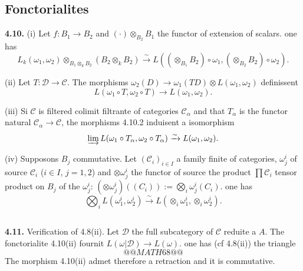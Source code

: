 \documentclass[12pt,a4paper]{article}
\theoremstyle{plain}
\theoremstyle{definition}
\theoremstyle{remark}
\begin{document}
\subsection{Fonctorialites}

\textbf{4.10.} (i) Let $f : B_1 \to B_2$ and $(\cdot) \otimes_{B_2} B_1$ the functor of extension of scalars. one has
\begin{equation}\label{eq:4.10.1}
L_k(\omega_1, \omega_2) \otimes_{B_1 \otimes_k B_2} (B_2 \otimes_k B_2) \xrightarrow{\sim} L((\otimes_{B_1} B_2) \circ \omega_1, (\otimes_{B_2} B_2) \circ \omega_2).
\end{equation}

(ii) Let $T : \mathcal{D} \to \mathcal{C}$. The morphisms $\omega_2(D) \to \omega_1(TD) \otimes L(\omega_1,\omega_2)$ definissent
\begin{equation}\label{eq:4.10.2}
L(\omega_1 \circ T, \omega_2 \circ T) \longrightarrow L(\omega_1,\omega_2).
\end{equation}

(iii) Si $\mathcal{C}$ is filtered colimit filtrante of categories $\mathcal{C}_\alpha$ and that $T_\alpha$ is the functor natural $\mathcal{C}_\alpha \to \mathcal{C}$, the morphisms 4.10.2 induisent a isomorphism
\begin{equation}\label{eq:4.10.3}
\varinjlim L(\omega_1 \circ T_\alpha, \omega_2 \circ T_\alpha) \xrightarrow{\sim} L(\omega_1,\omega_2).
\end{equation}

(iv) Supposons $B_j$ commutative. Let $(\mathcal{C}_i)_{i \in I}$ a family finite of categories, $\omega_j^i$ of source $\mathcal{C}_i$ ($i \in I$, $j = 1,2$) and $\otimes \omega_j^i$ the functor of source the product $\prod \mathcal{C}_i$ tensor product on $B_j$ of the $\omega_j^i$: $(\otimes \omega_j^i)((C_i)) := \bigotimes_i \omega_j^i(C_i)$. one has
\[
\bigotimes_i L(\omega_1^i, \omega_2^i) \xrightarrow{\sim} L(\otimes_i \omega_1^i, \otimes_i \omega_2^i).
\]

\subsection{}

\textbf{4.11.} Verification of 4.8(ii). Let $\mathcal{D}$ the full subcategory of $\mathcal{C}$ reduite a $A$. The fonctorialite 4.10(ii) fournit $L(\omega|\mathcal{D}) \to L(\omega)$. one has (cf 4.8(ii)) the triangle
\[
@@MATH68@@
\]
The morphism 4.10(ii) admet therefore a retraction and it is commutative.
\end{document}
